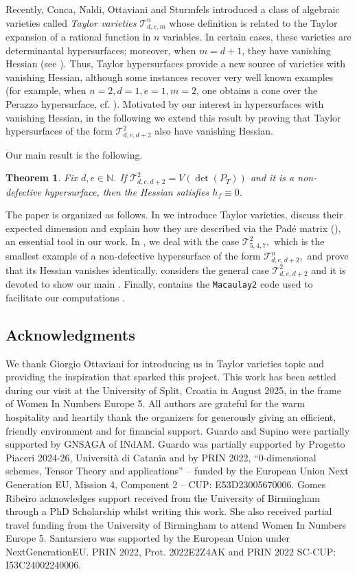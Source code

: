 \documentclass[letterpaper,11pt]{amsart}
\theoremstyle{plain}
\newtheorem{theorem}{Theorem}[section]
\theoremstyle{definition}
\newcommand{\tv}{\mathcal{T}}
\begin{document}
Recently, Conca, Naldi, Ottaviani and Sturmfels \cite{TV23} introduced a class of algebraic varieties called \emph{Taylor varieties} $\mathcal{T}^n_{d,e,m}$ whose definition is related to the Taylor expansion of a rational function in $n$ variables. In certain cases, these varieties are determinantal hypersurfaces; moreover,  when $m = d+1$, they have vanishing Hessian (see \cite[Theorem 4.4]{TV23}). Thus, Taylor hypersurfaces provide a new source of varieties with vanishing Hessian, although some instances recover very well known examples (for example, when $n = 2, d = 1, e = 1, m = 2$, one obtains a cone over the Perazzo hypersurface, cf. \cite[Example 4.3]{TV23}).
Motivated by our interest in hypersurfaces with vanishing Hessian, in the following we extend this result by proving that Taylor hypersurfaces of the form $\mathcal{T}^2_{d,e,d+2}$ also have vanishing Hessian.


Our main result is the following.
\begin{theorem}\label{theorem: main}
Fix $d, e \in \mathbb{N}$. If $\mathcal{T}^2_{d,e,d+2} = V(\det(P_T))$ and it is a non-defective hypersurface, 
then the Hessian satisfies $h_f \equiv 0$.
\end{theorem}
The paper is organized as follows. In  we introduce Taylor varieties, discuss their expected dimension and explain how they are described via the Pad\'e matrix (), an essential tool in our work. In , we deal with the case $\tv^2_{5,4,7},$ which is the smallest example of a non-defective hypersurface of the form $\tv^n_{d,e,d+2},$ and prove that its Hessian vanishes identically.  considers the general case $\tv^2_{d,e,d+2}$ and it is devoted to show our main . Finally,  contains the  \texttt{Macaulay2} code used to facilitate our computations \cite{M2}.

\subsection*{Acknowledgments} We thank Giorgio Ottaviani for introducing us in Taylor varieties topic and providing the inspiration that sparked this project.  This work has been settled during our visit at the University of Split, Croatia in August 2025, in the frame of Women In Numbers Europe 5. All authors are grateful for the warm hospitality and heartily thank the organizers for generously giving an efficient, friendly environment and for financial support.  Guardo and Supino were partially supported by GNSAGA of INdAM. Guardo was partially supported by Progetto Piaceri 2024-26, Università di Catania and by PRIN 2022, “$0$-dimensional schemes, Tensor Theory and applications” – funded by the European Union Next Generation EU, Mission 4, Component 2 -- CUP: E53D23005670006. Gomes Ribeiro acknowledges support received from the University of Birmingham through a PhD Scholarship whilst writing this work. She also received partial travel funding from the University of Birmingham to attend Women In Numbers Europe 5. Santarsiero was supported by the European Union under NextGenerationEU. PRIN 2022, Prot. 2022E2Z4AK and PRIN 2022 SC-CUP: I53C24002240006.
\end{document}
